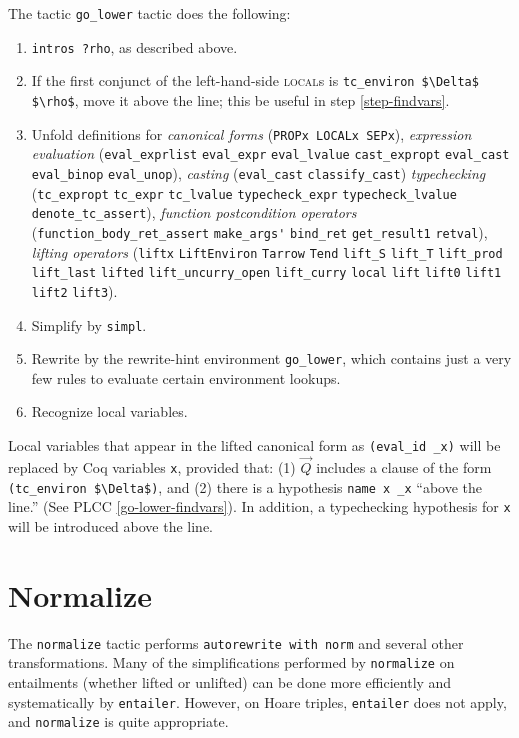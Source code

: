 \documentclass[12pt,fleqn,openany,oneside,showtrims]{memoir}
\begin{document}
The tactic \lstinline{go_lower} tactic
does the following:
\begin{enumerate}
\item \lstinline{intros ?rho}, as described above.
\item If the first conjunct of the 
left-hand-side \textsc{local}s is
\lstinline{tc_environ $\Delta$ $\rho$}, move it
above the line; this be useful in step \ref{step-findvars}.
\item Unfold definitions for
\emph{canonical forms}
(\lstinline{PROPx LOCALx SEPx}),
\emph{expression evaluation}
(\lstinline{eval_exprlist}
\lstinline{eval_expr}
\lstinline{eval_lvalue}
\lstinline{cast_expropt}
\lstinline{eval_cast}
\lstinline{eval_binop}
\lstinline{eval_unop}),
\emph{casting} (\lstinline{eval_cast} \lstinline{classify_cast})
\emph{typechecking} (\lstinline{tc_expropt}
\lstinline{tc_expr}
\lstinline{tc_lvalue}
\lstinline{typecheck_expr}
\lstinline{typecheck_lvalue}
\lstinline{denote_tc_assert}),
\emph{function postcondition operators} (\lstinline{function_body_ret_assert}
\lstinline{make_args'}
\lstinline{bind_ret}
\lstinline{get_result1}
\lstinline{retval}),
\emph{lifting operators} (\lstinline{liftx}
\lstinline{LiftEnviron}
\lstinline{Tarrow}
\lstinline{Tend}
\lstinline{lift_S}
\lstinline{lift_T}
\lstinline{lift_prod}
\lstinline{lift_last}
\lstinline{lifted}
\lstinline{lift_uncurry_open}
\lstinline{lift_curry}
\lstinline{local}
\lstinline{lift}
\lstinline{lift0}
\lstinline{lift1}
\lstinline{lift2}
\lstinline{lift3}).
\item Simplify by \lstinline{simpl}.
\item Rewrite by the rewrite-hint environment \lstinline{go_lower}, which contains just a very few rules to evaluate certain environment lookups.
\item Recognize local variables. \label{step-findvars}
\end{enumerate}

Local variables that appear in the lifted canonical form
as \lstinline{(eval_id _x)} will be replaced by
Coq variables \lstinline{x}, provided that:
(1)  $\vec{Q}$ includes a clause of the
form \lstinline{(tc_environ $\Delta$)},
and (2) there is a hypothesis \lstinline{name x _x} ``above the line.''
(See PLCC \autoref{go-lower-findvars}).
In addition, a typechecking hypothesis for \lstinline{x}
will be introduced above the line.

\chapter{Normalize}
The \lstinline{normalize} tactic performs
\lstinline{autorewrite with norm} and several other transformations.
Many of the simplifications performed by \lstinline{normalize}
on entailments (whether lifted or unlifted)
can be done more efficiently and systematically by
\lstinline{entailer}.  However, on Hoare triples, \lstinline{entailer}
does not apply, and \lstinline{normalize} is quite appropriate.
\end{document}
